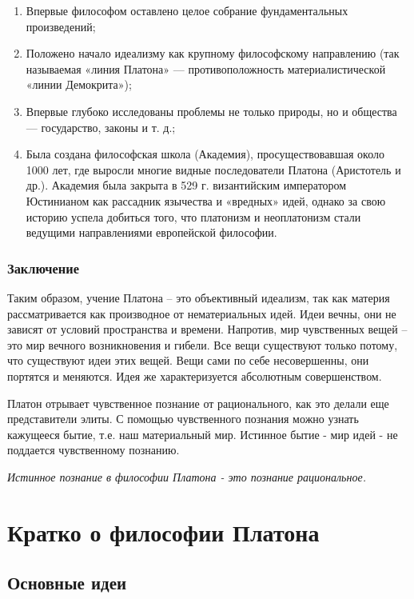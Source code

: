 \documentclass[a4paper, 14pt]{extreport}
\begin{document}
\begin{enumerate}
\def\labelenumi{\arabic{enumi}.}
\item
  Впервые философом оставлено целое собрание фундамен­тальных
  произведений;
\item
  Положено начало идеализму как крупному философскому направлению (так
  называемая «линия Платона» --- противоположность материалистической
  «линии Демокрита»);
\item
  Впервые глубоко исследованы проблемы не только природы, но и общества
  --- государство, законы и т. д.;
\item
  Была создана философская школа (Академия), просуществовавшая около
  1000 лет, где выросли многие видные последователи Платона (Аристотель
  и др.). Академия была закрыта в 529 г. византийским императором
  Юстинианом как рассадник язычества и «вредных» идей, однако за свою
  историю успела добиться того, что платонизм и неоплатонизм стали
  ведущими направлениями европейской философии.
\end{enumerate}

\subsubsection{Заключение}

Таким образом, учение Платона -- это объективный идеализм, так как
материя рассматривается как производное от нематериальных идей. Идеи
вечны, они не зависят от условий пространства и времени. Напротив, мир
чувственных вещей -- это мир вечного возникновения и гибели. Все вещи
существуют только потому, что существуют идеи этих вещей. Вещи сами по
себе несовершенны, они портятся и меняются. Идея же характеризуется
абсолютным совершенством.

Платон отрывает чувственное познание от рационального, как это делали
еще представители элиты. С помощью чувственного познания можно узнать
кажущееся бытие, т.е. наш материальный мир. Истинное бытие - мир идей -
не поддается чувственному познанию.

\emph{Истинное познание в философии Платона - это познание
рациональное.}

\section{Кратко о философии Платона}

\subsection{Основные идеи}
\end{document}
